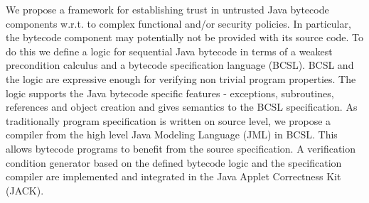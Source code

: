 

We propose a framework for establishing trust in untrusted Java bytecode components w.r.t. to complex functional and/or security policies. In particular, the bytecode component may potentially not be provided with its source code. To do this we define a logic for sequential Java bytecode in terms of a weakest precondition calculus and a bytecode specification language (BCSL). BCSL and the logic are expressive enough for verifying non trivial program properties. The logic supports the Java bytecode specific features - exceptions, subroutines, references and object creation and gives semantics to the BCSL specification. As traditionally program specification is written on source level, we propose a compiler from the high level Java Modeling Language (JML) in BCSL. This allows bytecode programs to benefit from the source specification. A verification condition generator based on the defined bytecode logic and the specification compiler are implemented and integrated in the Java Applet Correctness Kit (JACK).
